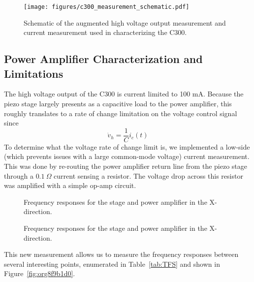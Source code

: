 \documentclass[journal,12pt,twocolumn,twoside]{IEEEtran/IEEEtran}
\begin{document}
\begin{figure}
  \texttt{[image: figures/c300\_measurement\_schematic.pdf]}
  \caption{Schematic of the augmented high voltage output measurement and current measurement used in characterizing the C300.}
  \label{fig:c300_meas}
\end{figure}

\subsection{Power Amplifier Characterization and Limitations}\label{sec:powcharct}
The high voltage output of the C300 is current limited to 100 mA. Because the piezo stage largely presents as a capacitive load to the power amplifier, this roughly translates to a rate of change limitation on the voltage control signal since
\begin{equation}
\dot v_{h} = \frac{1}{C} i_c(t)
\end{equation}
To determine what the voltage rate of change limit is, we implemented a low-side (which prevents issues with a large common-mode voltage) current measurement. This was done by re-routing the power amplifier return line from the piezo stage through a $0.1~\Omega$ current sensing a resistor. The voltage drop across this resistor was amplified with a simple op-amp circuit.

\begin{figure*}[htbp]
  \begin{minipage}{0.48\textwidth}
\centering

\caption{\label{fig:org8f9b1d0}
Frequency responses for the stage and power amplifier in the X-direction.}
\end{minipage}
\hfill
\begin{minipage}{0.48\textwidth}
\centering

\caption{\label{fig:orgc576458}
  Frequency responses for the stage and power amplifier in the X-direction.}
\end{minipage}
\end{figure*}

This new measurement allows us to measure the frequency responses between several interesting points, enumerated in Table~\ref{tab:TFS} and shown in Figure~\ref{fig:org8f9b1d0}.
\end{document}
